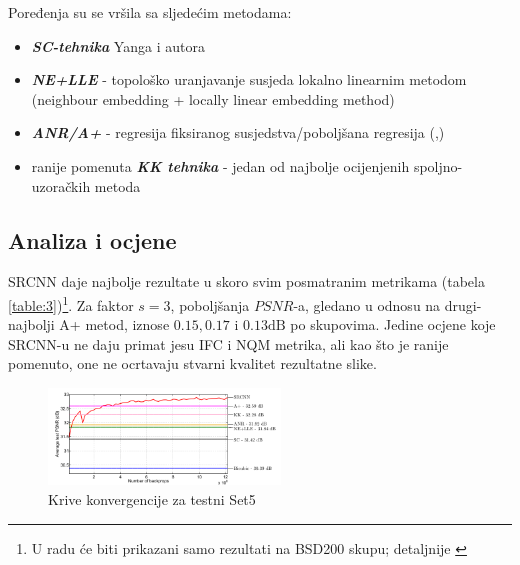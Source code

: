 \documentclass[12pt]{report}
\numberwithin{equation}{section}
\begin{document}
  Poređenja su se vršila sa sljedećim metodama: 

  
 \begin{itemize}
  
 \item \textbf{\textit{SC-tehnika}} Yanga i autora \cite{sparse1}
 \item \textbf{\textit{NE+LLE}} - topološko uranjavanje susjeda lokalno linearnim metodom (neighbour embedding + locally linear embedding method) \cite{nelle}
 \item \textbf{\textit{ANR/A+}} - regresija fiksiranog susjedstva/poboljšana regresija  (\cite{anr},\cite{aplus})
 \item ranije pomenuta \textit{\textbf{KK tehnika}} - jedan od najbolje ocijenjenih spoljno-uzoračkih metoda \cite{kernel} 
  
\end{itemize}   

   \subsection{Analiza i ocjene}
   
 SRCNN daje najbolje rezultate u skoro svim posmatranim metrikama (tabela \ref{table:3})\footnote{U radu će biti prikazani samo rezultati na BSD200 skupu; detaljnije \cite{main}}. Za faktor $s=3$, poboljšanja $PSNR$-a, gledano u odnosu na drugi-najbolji A+ metod, iznose $0.15, 0.17$ i $0.13\text{dB}$ po skupovima. Jedine ocjene koje SRCNN-u ne daju primat jesu  IFC i NQM metrika, ali kao što je ranije pomenuto, one ne ocrtavaju stvarni kvalitet rezultatne slike. 
 
 
 \begin{figure}
\vspace{-20pt}  
  \begin{center}
    \includegraphics[width=0.55\textwidth]{SLIKE/figre10}
  \end{center}
  \vspace{-20pt}
  \caption{Krive konvergencije za testni Set5}
  \label{fig:test10}
  \vspace{-20pt}
\end{figure}
\end{document}
